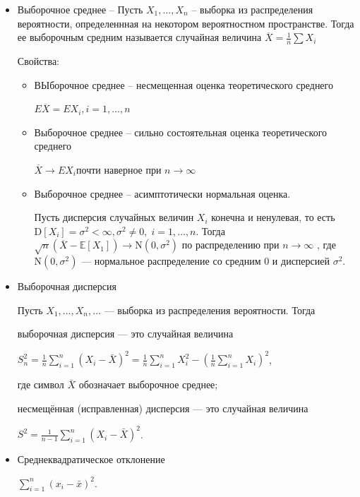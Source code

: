\documentclass{article}
\begin{document}
\begin{itemize}
	\item Выборочное среднее -- Пусть $X_1, ..., X_n$ -- выборка из распределения вероятности, определеннная на некотором вероятностном пространстве. Тогда ее выборочным средним называется случайная величина $\overline{X} = \frac{1}{n}\sum X_i$
	
	Свойства: 
	\begin{itemize}
		\item ВЫборочное среднее -- несмещенная оценка теоретического среднего
		
		$E\overline{X} = E X_i, i = 1, ..., n$
		\item Выборочное среднее -- сильно состоятельная оценка теоретического среднего
		
		$\overline{X} \rightarrow E X_i $почти наверное при $n \rightarrow \infty$
		
		\item Выборочное среднее -- асимптотически нормальная оценка.
		
		Пусть дисперсия случайных величин $X_{i}$ конечна и ненулевая, то есть $\mathrm {D} [X_{i}]=\sigma ^{2}<\infty ,\sigma ^{2}\not =0,\;i=1,\ldots ,n$. Тогда
	    $\sqrt {n}\left({\overline {X}}-\mathbb {E} [X_{1}]\right)\to \mathrm {N} (0,\sigma ^{2})$ по распределению при $n\to \infty$ ,
		где $\mathrm {N} (0,\sigma ^{2})$ — нормальное распределение со средним $0$ и дисперсией $\sigma ^{2}$.
	\end{itemize}
	
	\item Выборочная дисперсия
	
	Пусть $X_{1},\ldots ,X_{n},\ldots$  — выборка из распределения вероятности. Тогда
	
	выборочная дисперсия — это случайная величина
	
	$S_{n}^{2}={\frac  {1}{n}}\sum \limits _{{i=1}}^{n}\left(X_{i}-{\bar  {X}}\right)^{2}={\frac  {1}{n}}\sum \limits _{{i=1}}^{n}X_{i}^{2}-\left({\frac  {1}{n}}\sum \limits _{{i=1}}^{n}X_{i}\right)^{2}$,
	
	где символ $\bar  {X}$ обозначает выборочное среднее;
	
	несмещённая (исправленная) дисперсия — это случайная величина
	
	$S^{2}={\frac  {1}{n-1}}\sum \limits _{{i=1}}^{n}\left(X_{i}-{\bar  {X}}\right)^{2}$.
	
	\item Среднеквадратическое отклонение 
	
	$\sum _{i=1}^{n}\left(x_{i}-{\bar {x}}\right)^{2}.$
\end{itemize}
\end{document}
